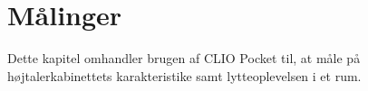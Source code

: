 \chapter{Målinger}
\label{chapt:Maal}
Dette kapitel omhandler brugen af CLIO Pocket til, at måle på højtalerkabinettets karakteristike samt lytteoplevelsen i et rum.



